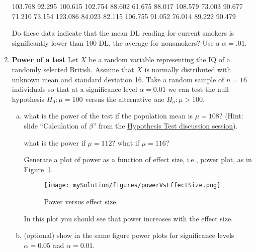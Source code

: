 \documentclass[12pt]{article}
\begin{document}
\begin{enumerate}
	103.768 92.295 100.615 102.754 88.602 61.675 88.017 108.579 73.003 90.677 71.210 73.154 123.086 84.023 82.115 106.755 91.052 76.014 89.222 90.479

	Do these data indicate that the mean DL reading for current smokers is signiﬁcantly lower than 100 DL, the average for nonsmokers? Use a $\alpha=.01$.

    \item \textbf{Power of a test} Let $X$ be a random variable representing
        the IQ of a randomly selected British. Assume that $X$ is normally
        distributed with unknown mean and standard deviation 16. Take a random
        sample of $n=16$ individuals so that at a significance level
        $\alpha=0.01$ we can test the null hypothesis $H_0:\mu=100$ versus the
        alternative one $H_a:\mu>100$.

            \begin{enumerate}[(a)]
                \item what is the power of the test if the population mean is
                    $\mu=108$? (Hint: slide ``Calculation of $\beta$'' from the
                    \href{https://github.com/joacorapela/neuroinformatics24/blob/master/practicals/01_tTestAndRandomizationTests/introAndHipothesisTests.pdf}{Hypothesis Test discussion session}).
                    
                    what is the power if $\mu=112$? what if $\mu=116$?

                    Generate a plot of power as a function of effect size,
                    i.e., power plot, as in Figure~\ref{fig:powerVsEffectSize}.

                    \begin{figure}
                        \begin{center}
                            \texttt{[image: mySolution/figures/powerVsEffectSize.png]}
                        \end{center}
                        \caption{Power versus effect size.}
                        \label{fig:powerVsEffectSize}
                    \end{figure}

                    In this plot you should see that power increases with the
                    effect size.

                \item (optional) show in the same figure power plots for significance
                    levels $\alpha=0.05$ and $\alpha=0.01$.


\end{enumerate}
\end{enumerate}
\end{document}
